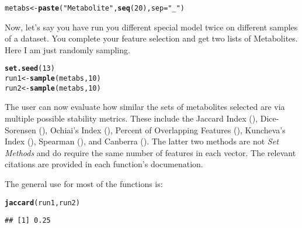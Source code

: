 \documentclass[12pt]{article}\usepackage[]{graphicx}\usepackage[usenames,dvipsnames]{color}
\makeatletter
\newcommand{\hlnum}[1]{\textcolor[rgb]{0.686,0.059,0.569}{#1}}%
\newcommand{\hlstr}[1]{\textcolor[rgb]{0.192,0.494,0.8}{#1}}%
\newcommand{\hlstd}[1]{\textcolor[rgb]{0.345,0.345,0.345}{#1}}%
\newcommand{\hlkwb}[1]{\textcolor[rgb]{0.69,0.353,0.396}{#1}}%
\newcommand{\hlkwc}[1]{\textcolor[rgb]{0.333,0.667,0.333}{#1}}%
\newcommand{\hlkwd}[1]{\textcolor[rgb]{0.737,0.353,0.396}{\textbf{#1}}}%
\newenvironment{kframe}{%
 \def\at@end@of@kframe{}%
 \ifinner\ifhmode%
  \def\at@end@of@kframe{\end{minipage}}%
  \begin{minipage}{\columnwidth}%
 \fi\fi%
 \def\FrameCommand##1{\hskip\@totalleftmargin \hskip-\fboxsep
 \colorbox{shadecolor}{##1}\hskip-\fboxsep
     \hskip-\linewidth \hskip-\@totalleftmargin \hskip\columnwidth}%
 \MakeFramed {\advance\hsize-\width
   \@totalleftmargin\z@ \linewidth\hsize
   \@setminipage}}%
 {\par\unskip\endMakeFramed%
 \at@end@of@kframe}
\newenvironment{knitrout}{}{} %
\makeatother
\begin{document}
\begin{knitrout}
\color{fgcolor}\begin{kframe}
\begin{alltt}
\hlstd{metabs} \hlkwb{<-} \hlkwd{paste}\hlstd{(}\hlstr{"Metabolite"}\hlstd{,} \hlkwd{seq}\hlstd{(}\hlnum{20}\hlstd{),} \hlkwc{sep}\hlstd{=}\hlstr{"_"}\hlstd{)}
\end{alltt}
\end{kframe}
\end{knitrout}

Now, let's say you have run you different special model twice on different 
samples of a dataset.  You complete your feature selection and get two lists
of Metabolites.  Here I am just randomly sampling.

\begin{knitrout}
\color{fgcolor}\begin{kframe}
\begin{alltt}
\hlkwd{set.seed}\hlstd{(}\hlnum{13}\hlstd{)}
\hlstd{run1} \hlkwb{<-} \hlkwd{sample}\hlstd{(metabs,} \hlnum{10}\hlstd{)}
\hlstd{run2} \hlkwb{<-} \hlkwd{sample}\hlstd{(metabs,} \hlnum{10}\hlstd{)}
\end{alltt}
\end{kframe}
\end{knitrout}

The user can now evaluate how similar the sets of metabolites selected are via
multiple possible stability metrics.  These include the Jaccard Index 
(), Dice-Sorensen (), Ochiai's Index 
(), Percent of Overlapping Features (), 
Kuncheva's Index (), Spearman (), and
Canberra ().  The latter two methods are not 
\emph{Set Methods} and do require the same number of features in each vector.
The relevant citations are provided in each function's documenation.

The general use for most of the functions is:

\begin{knitrout}
\color{fgcolor}\begin{kframe}
\begin{alltt}
\hlkwd{jaccard}\hlstd{(run1, run2)}
\end{alltt}
\begin{verbatim}
## [1] 0.25
\end{verbatim}
\end{kframe}
\end{knitrout}
\end{document}
